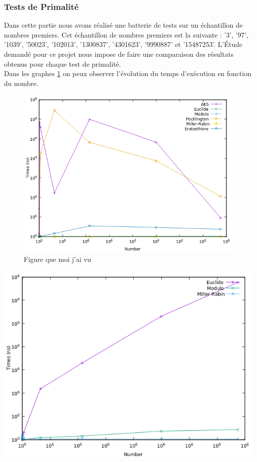 		\subsubsection{Tests de Primalité}
	Dans cette partie nous avons réalisé une batterie de tests sur un échantillon de nombres premiers. Cet échantillon de nombres premiers est la suivante : '3', '97', '1039', '50023', '102013', '1300837', '4301623', '9990887' et '15487253'. L’Étude demandé pour ce projet nous impose de faire une comparaison des résultats obtenus pour chaque test de primalité.\\
	Dans les graphes \ref{fg:fig1} on peux observer l'évolution du temps d'exécution en fonction du nombre.
\begin{figure}[!ht]	
		\begin{center}\includegraphics[scale=0.6]{result.png}\end{center}
		\caption{Figure que moi j'ai vu}
		\label{fg:fig1}
	\end{figure}
		\begin{center}\includegraphics[scale=0.6]{result2.png}\end{center}
	
